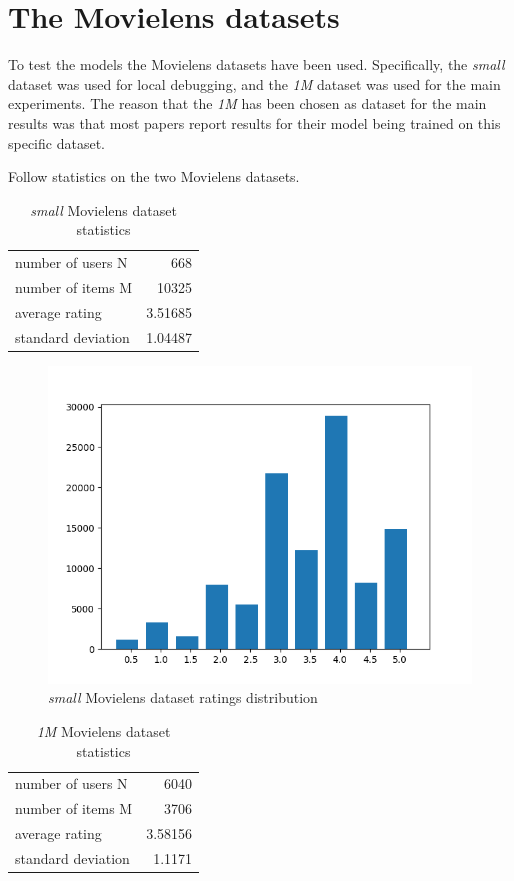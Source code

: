 \section{The Movielens datasets}

To test the models the Movielens datasets\cite{movielens} have been used. 
Specifically, the \emph{small} dataset was used for local debugging, and the \emph{1M}
dataset was used for the main experiments. The reason that the \emph{1M} has been
chosen as dataset for the main results was that most papers report results for their
model being trained on this specific dataset.

Follow statistics on the two Movielens datasets.

\begin{table}[H]
\centering
\begin{tabular}{l|r}
number of users N & 668 \\
number of items M & 10325 \\
average rating & 3.51685 \\
standard deviation & 1.04487 \\
\end{tabular}
\caption{\emph{small} Movielens dataset statistics}
\end{table}

\begin{figure}[H]
\centering
\includegraphics[scale=0.6]{small}
\caption{\emph{small} Movielens dataset ratings distribution}
\end{figure}

\begin{table}[H]
\centering
\begin{tabular}{l|r}
number of users N&  6040 \\ 
number of items M& 3706 \\
average rating & 3.58156 \\
standard deviation & 1.1171 \\
\end{tabular}
\caption{\emph{1M} Movielens dataset statistics}
\end{table}

